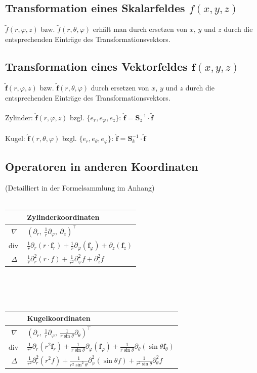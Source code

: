 \documentclass[6pt,a4paper]{scrartcl}
\newcommand{\ma}[1]{\ensuremath{\boldsymbol {#1}}}												%
\renewcommand{\vec}[1]{\ensuremath{\boldsymbol {#1}}}											%
\renewcommand{\div}{\ensuremath{\mathrm{div}\ }}								%
\begin{document}
\begin{multicols*}{4}
\subsection{Transformation eines Skalarfeldes $f(x,y,z)$}
$\tilde{f}(r,\varphi,z)$ bzw.  $\tilde{f}(r,\theta,\varphi)$ erhält man durch ersetzen von $x$, $y$ und $z$ durch die entsprechenden Einträge des Transformationsvektors.


\subsection{Transformation eines Vektorfeldes $\vec f(x,y,z)$ }
$\tilde{\vec f}(r,\varphi,z)$ bzw. $\tilde{\vec f}(r,\theta,\varphi)$ durch ersetzen von $x$, $y$ und $z$ durch die entsprechenden Einträge des Transformationsvektors. \\ \\
Zylinder: $ \hat{\vec f}(r,\varphi,z)$ bzgl. $\{e_r,e_\varphi,e_z\}$: $\hat{\vec f} = \ma S_z^{-1} \cdot \tilde{\vec f}$ \\ \\
Kugel: $\hat{\vec f}(r,\theta,\varphi)$ bzgl. $\{e_r,e_\theta,e_\varphi\}$: $\hat{\vec f} = \ma S_k^{-1} \cdot \tilde{\vec f}$

\subsection{Operatoren in anderen Koordinaten}
(Detailliert in der Formelsammlung im Anhang) \\ \\
\begin{tabular}{c|l} 
 & Zylinderkoordinaten \\ \midrule
 $\nabla$ & $(\partial_r,\ \frac{1}{r}\partial_\varphi,\ \partial_z)^\top$ \\ \midrule
 $\div$ & $\frac{1}{r} \partial_r(r\cdot \vec f_r) + \frac{1}{r} \partial_\varphi(\vec f_\varphi) + \partial_z(\vec f_z)$ \\ \midrule
$ \Delta$ & $\frac{1}{r} \partial^2_{r}(r\cdot f) + \frac{1}{r^2} \partial^2_{\varphi}f + \partial^2_{z}f$
\end{tabular}
\\ \\ \\
\begin{tabular}{c|l} 
 & Kugelkoordinaten \\ \midrule

$\nabla$ & $(\partial_r,\ \frac{1}{r}\partial_\varphi,\ \frac{1}{r\sin\theta}\partial_\theta)^\top$\\ \midrule
$\div$ & $  \frac{1}{r^{2}}  \partial_r(r^2 \vec f_r) + \frac{1}{r \sin \theta} \partial_\varphi(\vec f_\varphi) + \frac{1}{r \sin \theta} \partial_\theta(\sin \theta \vec f_\theta)$\\ \midrule
$\Delta $ & $ \frac{1}{r^{2}} \partial^2_{r}(r^2 f) + \frac{1}{r^2\sin^2\theta} \partial^2_{\varphi} (\sin\theta f) + \frac{1}{r^2\sin\theta} \partial^2_{\theta} f$
\end{tabular}
\fi


\end{multicols*}
\end{document}
